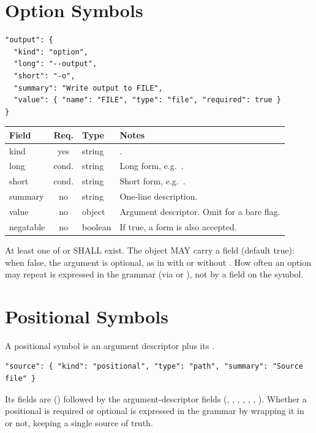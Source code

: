 \section{Option Symbols}

\begin{lstlisting}
"output": {
  "kind": "option",
  "long": "--output",
  "short": "-o",
  "summary": "Write output to FILE",
  "value": { "name": "FILE", "type": "file", "required": true }
}
\end{lstlisting}

\begin{tabulary}{\textwidth}{lclL}
Field & Req. & Type & Notes \\
\hline
kind      & yes   & string  & . \\
long      & cond. & string  & Long form, e.g.\ . \\
short     & cond. & string  & Short form, e.g.\ . \\
summary   & no    & string  & One-line description. \\
value     & no    & object  & Argument descriptor. Omit for a bare flag. \\
negatable & no    & boolean & If true, a  form is also accepted. \\
\end{tabulary}

At least one of  or  SHALL exist. The  object MAY carry a  field (default true): when false, the argument is optional, as in  with or without . How often an option may repeat is expressed in the grammar (via  or ), not by a field on the symbol.

\section{Positional Symbols}

A positional symbol is an argument descriptor plus its .

\begin{lstlisting}
"source": { "kind": "positional", "type": "path", "summary": "Source file" }
\end{lstlisting}

Its fields are  () followed by the argument-descriptor fields (, , , , , , ). Whether a positional is required or optional is expressed in the grammar by wrapping it in  or not, keeping a single source of truth.

